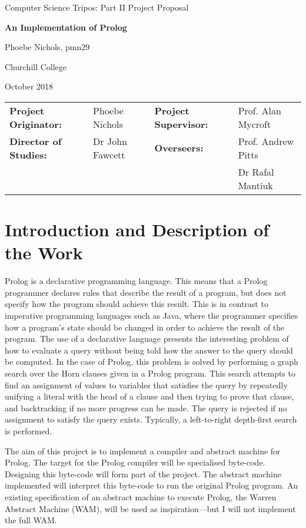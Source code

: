 \documentclass[12pt, a4paper]{article}
\begin{document}


\clearpage
\setcounter{page}{1}



\centerline{\large Computer Science Tripos: Part II Project Proposal}
\vspace{1em}
\centerline{\Large\bf An Implementation of Prolog}
\vspace{1em}
\centerline{Phoebe Nichols, pmn29}
\centerline{Churchill College}
\centerline{October 2018}

\vspace{2em}

\begin{center}
\begin{tabular}{ l l l l }
{\bf Project Originator:} & Phoebe Nichols & {\bf Project Supervisor:} & Prof. Alan Mycroft \\[3mm]
{\bf Director of Studies:} & Dr John Fawcett & {\bf Overseers:} & Prof. Andrew Pitts \\[0.5mm]
&&&  Dr Rafal Mantiuk
\end{tabular}
\end{center}
\section*{Introduction and Description of the Work}

Prolog is a declarative programming language. This means that a Prolog programmer declares rules that describe the result of a program, but does not specify how the program should achieve this result. This is in contrast to imperative programming languages such as Java, where the programmer specifies how a program's state should be changed in order to achieve the result of the program. The use of a declarative language presents the interesting problem of how to evaluate a query without being told how the answer to the query should be computed. In the case of Prolog, this problem is solved by performing a graph search over the Horn clauses given in a Prolog program. This search attempts to find an assignment of values to variables that satisfies the query by repeatedly unifying a literal with the head of a clause and then trying to prove that clause, and backtracking if no more progress can be made.
The query is rejected if no assignment to satisfy the query exists. Typically, a left-to-right depth-first search is performed.

The aim of this project is to implement a compiler and abstract machine for Prolog. The target for the Prolog compiler will be specialised byte-code. Designing this byte-code will form part of the project. The abstract machine implemented will interpret this byte-code to run the original Prolog program. An existing specification of an abstract machine to execute Prolog, the Warren Abstract Machine (WAM), will be used as inspiration---but I will not implement the full WAM.
\end{document}

